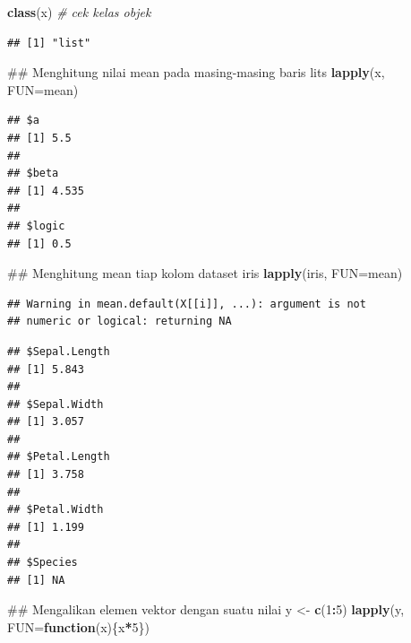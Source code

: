 \documentclass[]{book}
\newenvironment{Shaded}{\begin{snugshade}}{\end{snugshade}}
\newcommand{\KeywordTok}[1]{\textcolor[rgb]{0.13,0.29,0.53}{\textbf{#1}}}
\newcommand{\DataTypeTok}[1]{\textcolor[rgb]{0.13,0.29,0.53}{#1}}
\newcommand{\DecValTok}[1]{\textcolor[rgb]{0.00,0.00,0.81}{#1}}
\newcommand{\StringTok}[1]{\textcolor[rgb]{0.31,0.60,0.02}{#1}}
\newcommand{\CommentTok}[1]{\textcolor[rgb]{0.56,0.35,0.01}{\textit{#1}}}
\newcommand{\ControlFlowTok}[1]{\textcolor[rgb]{0.13,0.29,0.53}{\textbf{#1}}}
\newcommand{\OperatorTok}[1]{\textcolor[rgb]{0.81,0.36,0.00}{\textbf{#1}}}
\newcommand{\NormalTok}[1]{#1}
\begin{document}
\begin{Shaded}
\begin{Highlighting}[]
\KeywordTok{class}\NormalTok{(x) }\CommentTok{# cek kelas objek}
\end{Highlighting}
\end{Shaded}

\begin{verbatim}
## [1] "list"
\end{verbatim}

\begin{Shaded}
\begin{Highlighting}[]
\NormalTok{## Menghitung nilai mean pada masing-masing baris lits}
\KeywordTok{lapply}\NormalTok{(x, }\DataTypeTok{FUN=}\NormalTok{mean)}
\end{Highlighting}
\end{Shaded}

\begin{verbatim}
## $a
## [1] 5.5
## 
## $beta
## [1] 4.535
## 
## $logic
## [1] 0.5
\end{verbatim}

\begin{Shaded}
\begin{Highlighting}[]
\NormalTok{## Menghitung mean tiap kolom dataset iris}
\KeywordTok{lapply}\NormalTok{(iris, }\DataTypeTok{FUN=}\NormalTok{mean)}
\end{Highlighting}
\end{Shaded}

\begin{verbatim}
## Warning in mean.default(X[[i]], ...): argument is not
## numeric or logical: returning NA
\end{verbatim}

\begin{verbatim}
## $Sepal.Length
## [1] 5.843
## 
## $Sepal.Width
## [1] 3.057
## 
## $Petal.Length
## [1] 3.758
## 
## $Petal.Width
## [1] 1.199
## 
## $Species
## [1] NA
\end{verbatim}

\begin{Shaded}
\begin{Highlighting}[]
\NormalTok{## Mengalikan elemen vektor dengan suatu nilai}
\NormalTok{y <-}\StringTok{ }\KeywordTok{c}\NormalTok{(}\DecValTok{1}\OperatorTok{:}\DecValTok{5}\NormalTok{)}
\KeywordTok{lapply}\NormalTok{(y, }\DataTypeTok{FUN=}\ControlFlowTok{function}\NormalTok{(x)\{x}\OperatorTok{*}\DecValTok{5}\NormalTok{\})}
\end{Highlighting}
\end{Shaded}
\end{document}
